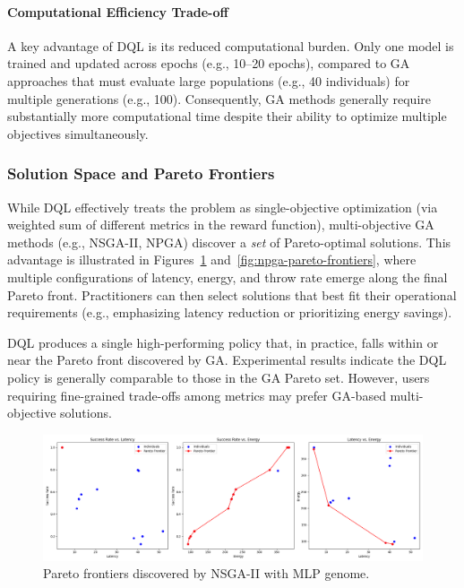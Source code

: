 \documentclass[preprint,3p,authoryear]{elsarticle}
\begin{document}
\paragraph{Computational Efficiency Trade-off}
A key advantage of DQL is its reduced computational burden. Only one model is trained and updated across epochs (e.g., 10--20 epochs), compared to GA approaches that must evaluate large populations (e.g., 40 individuals) for multiple generations (e.g., 100). Consequently, GA methods generally require substantially more computational time despite their ability to optimize multiple objectives simultaneously.

\subsubsection{Solution Space and Pareto Frontiers}

While DQL effectively treats the problem as single-objective optimization (via weighted sum of different metrics in the reward function), multi-objective GA methods (e.g., NSGA-II, NPGA) discover a \emph{set} of Pareto-optimal solutions. This advantage is illustrated in Figures~\ref{fig:nsga2-pareto-frontiers} and~\ref{fig:npga-pareto-frontiers}, where multiple configurations of latency, energy, and throw rate emerge along the final Pareto front. Practitioners can then select solutions that best fit their operational requirements (e.g., emphasizing latency reduction or prioritizing energy savings).

DQL produces a single high-performing policy that, in practice, falls within or near the Pareto front discovered by GA. Experimental results indicate the DQL policy is generally comparable to those in the GA Pareto set. However, users requiring fine-grained trade-offs among metrics may prefer GA-based multi-objective solutions.

\begin{figure}[H]
    \centering
    \includegraphics[width=0.9\linewidth]{figs/pareto_frontiers_nsga2.png}
    \caption{Pareto frontiers discovered by NSGA-II with MLP genome.}
    \label{fig:nsga2-pareto-frontiers}
\end{figure}
\end{document}
